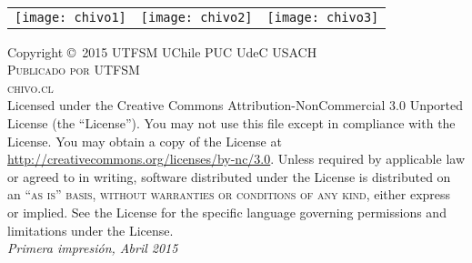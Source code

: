 \newpage
~\vfill
\thispagestyle{empty}

\begin{table}[ht!]
	\centering
	\begin{tabular}{ccc}
		\texttt{[image: chivo1]} & \texttt{[image: chivo2]} & \texttt{[image: chivo3]}
	\end{tabular}
\end{table}
\noindent Copyright \copyright\ 2015 UTFSM UChile PUC UdeC USACH\\ %

\noindent \textsc{Publicado por UTFSM}\\ %

\noindent \textsc{chivo.cl}\\ %

\noindent Licensed under the Creative Commons Attribution-NonCommercial 3.0 Unported License (the ``License''). You may not use this file except in compliance with the License. You may obtain a copy of the License at \url{http://creativecommons.org/licenses/by-nc/3.0}. Unless required by applicable law or agreed to in writing, software distributed under the License is distributed on an \textsc{``as is'' basis, without warranties or conditions of any kind}, either express or implied. See the License for the specific language governing permissions and limitations under the License.\\ %

\noindent \textit{Primera impresión, Abril 2015} %

